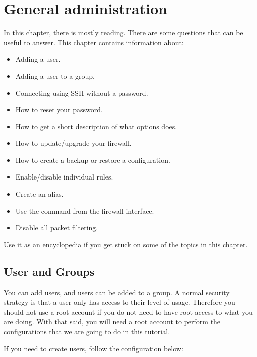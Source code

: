 \newpage

\section{General administration}
In this chapter, there is mostly reading. There are some questions that can be useful to answer. This chapter contains information about:
\begin{itemize}
    \item Adding a user.
    \item Adding a user to a group.
    \item Connecting using SSH without a password.
    \item How to reset your password.
    \item How to get a short description of what options does.
    \item How to update/upgrade your firewall.
    \item How to create a backup or restore a configuration.
    \item Enable/disable individual rules.
    \item Create an alias.
    \item Use the  command from the firewall interface.
    \item Disable all packet filtering.
\end{itemize}

Use it as an encyclopedia if you get stuck on some of the topics in this chapter.

\subsection{User and Groups} \label{user_groups}
You can add users, and users can be added to a group. A normal security strategy is that a user only has access to their level of usage. Therefore you should not use a root account if you do not need to have root access to what you are doing. With that said, you will need a root account to perform the configurations that we are going to do in this tutorial.

If you need to create users, follow the configuration below:

